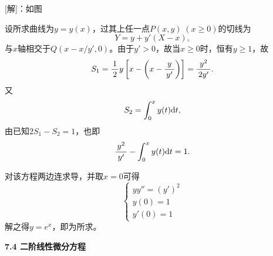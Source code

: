[解]：如图
\begin{center}
\end{center}
设所求曲线为$y=y(x)$，过其上任一点$P(x,y)\;(x\geq 0)$的切线为
$$Y=y+y'(X-x),$$
与$x$轴相交于$Q(x-x/y',0)$。由于$y'>0$，故当$x\geq 0$时，恒有$y\geq 1$，故
$$S_1=\displaystyle\frac{\,{1}\,}{\,{2}\,}y\left[x-\left(x-\displaystyle\frac{\,{y}\,}{\,{y'}\,}\right)\right]=\displaystyle\frac{\,{y^2}\,}{\,{2y'}\,}.$$
又
$$S_2=\displaystyle\int_0^xy(t)\mathrm{d} t,$$
由已知$2S_1-S_2=1$，也即
$$\displaystyle\frac{\,{y^2}\,}{\,{y'}\,}-\displaystyle\int_0^xy(t)\mathrm{d} t=1.$$

对该方程两边连求导，并取$x=0$可得
$$\left\{\begin{array}{l}
yy''=(y')^2\\
y(0)=1\\
y'(0)=1
\end{array}\right.$$
解之得$y=e^x$，即为所求。\fin

\bs

\begin{center}
	\bf 7.4 二阶线性微分方程
\end{center}

